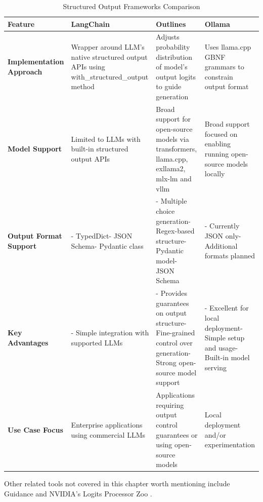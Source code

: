 \begin{table}[h]
\caption{Structured Output Frameworks Comparison}
\label{structured_output_frameworks}
\begin{tabular}{|p{}|p{}|p{}|p{}|}
\hline
\textbf{Feature} & \textbf{LangChain} & \textbf{Outlines} & \textbf{Ollama} \\
\hline
\textbf{Implementation Approach} & Wrapper around LLM's native structured output APIs using with\_structured\_output method & Adjusts probability distribution of model's output logits to guide generation & Uses llama.cpp GBNF grammars to constrain output format \\
\hline
\textbf{Model Support} & Limited to LLMs with built-in structured output APIs & Broad support for open-source models via transformers, llama.cpp, exllama2, mlx-lm and vllm & Broad support focused on enabling running open-source models locally \\
\hline
\textbf{Output Format Support} & - TypedDict\newline - JSON Schema\newline - Pydantic class & - Multiple choice generation\newline - Regex-based structure\newline - Pydantic model\newline - JSON Schema & - Currently JSON only\newline - Additional formats planned \\
\hline
\textbf{Key Advantages} & - Simple integration with supported LLMs & - Provides guarantees on output structure\newline - Fine-grained control over generation\newline - Strong open-source model support & - Excellent for local deployment\newline - Simple setup and usage\newline - Built-in model serving \\
\hline
\textbf{Use Case Focus} & Enterprise applications using commercial LLMs & Applications requiring output control guarantees or using open-source models & Local deployment and/or experimentation \\
\hline
\end{tabular}
\end{table}

Other related tools not covered in this chapter worth mentioning include Guidance \cite{guidance2024repo} and NVIDIA's Logits Processor Zoo \cite{nvidia2024logitsprocessorzoo}.

